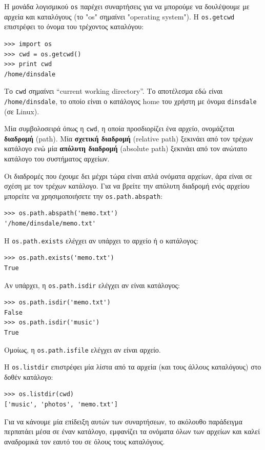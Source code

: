 \documentclass[10pt]{book}
\begin{document}
Η μονάδα λογισμικού {\tt os} παρέχει συναρτήσεις για να μπορούμε να δουλέψουμε με αρχεία και καταλόγους (το "os" σημαίνει "operating system"). Η {\tt os.getcwd} επιστρέφει το όνομα του τρέχοντος καταλόγου:

\begin{verbatim}
>>> import os
>>> cwd = os.getcwd()
>>> print cwd
/home/dinsdale
\end{verbatim}
%
Το {\tt cwd} σημαίνει ``current working directory''. Το αποτέλεσμα εδώ είναι {\tt /home/dinsdale}, 
το οποίο είναι ο κατάλογος home του χρήστη με όνομα {\tt dinsdale} (σε Linux).

Μία συμβολοσειρά όπως η {\tt cwd}, η οποία προσδιορίζει ένα αρχείο, ονομάζεται {\bf διαδρομή} (path).  
Μία {\bf σχετική διαδρομή} (relative path) ξεκινάει από τον τρέχων κατάλογο ενώ μία {\bf απόλυτη διαδρομή} (absolute path) ξεκινάει από τον ανώτατο κατάλογο του συστήματος αρχείων.

Οι διαδρομές που έχουμε δει μέχρι τώρα είναι απλά ονόματα αρχείων, άρα είναι σε σχέση με τον τρέχων κατάλογο. Για να βρείτε την απόλυτη διαδρομή ενός αρχείου μπορείτε να χρησιμοποιήσετε την {\tt os.path.abspath}:

\begin{verbatim}
>>> os.path.abspath('memo.txt')
'/home/dinsdale/memo.txt'
\end{verbatim}
%
Η {\tt os.path.exists} ελέγχει αν υπάρχει το αρχείο ή ο κατάλογος:

\begin{verbatim}
>>> os.path.exists('memo.txt')
True
\end{verbatim}
%
Αν υπάρχει, η {\tt os.path.isdir} ελέγχει αν είναι κατάλογος:

\begin{verbatim}
>>> os.path.isdir('memo.txt')
False
>>> os.path.isdir('music')
True
\end{verbatim}
%
Ομοίως, η {\tt os.path.isfile} ελέγχει αν είναι αρχείο. 

Η {\tt os.listdir} επιστρέφει μία λίστα από τα αρχεία (και τους άλλους καταλόγους) στο δοθέν κατάλογο:

\begin{verbatim}
>>> os.listdir(cwd)
['music', 'photos', 'memo.txt']
\end{verbatim}
%
Για να κάνουμε μία επίδειξη αυτών των συναρτήσεων, το ακόλουθο παράδειγμα περπατάει μέσα σε έναν κατάλογο, εμφανίζει τα ονόματα όλων των αρχείων και καλεί αναδρομικά τον εαυτό του σε όλους τους καταλόγους. 
\end{document}
